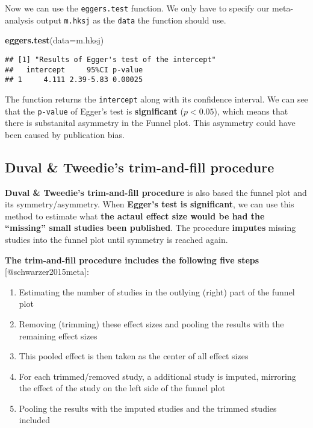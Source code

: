 \documentclass[]{book}
\newenvironment{Shaded}{\begin{snugshade}}{\end{snugshade}}
\newcommand{\KeywordTok}[1]{\textcolor[rgb]{0.13,0.29,0.53}{\textbf{#1}}}
\newcommand{\DataTypeTok}[1]{\textcolor[rgb]{0.13,0.29,0.53}{#1}}
\newcommand{\NormalTok}[1]{#1}
\providecommand{\tightlist}{%
  \setlength{\itemsep}{0pt}\setlength{\parskip}{0pt}}
\theoremstyle{definition}
\theoremstyle{definition}
\theoremstyle{definition}
\theoremstyle{remark}
\begin{document}
Now we can use the \texttt{eggers.test} function. We only have to
specify our meta-analysis output \texttt{m.hksj} as the \texttt{data}
the function should use.

\begin{Shaded}
\begin{Highlighting}[]
\KeywordTok{eggers.test}\NormalTok{(}\DataTypeTok{data=}\NormalTok{m.hksj)}
\end{Highlighting}
\end{Shaded}

\begin{verbatim}
## [1] "Results of Egger's test of the intercept"
##   intercept     95%CI p-value
## 1     4.111 2.39-5.83 0.00025
\end{verbatim}

The function returns the \texttt{intercept} along with its confidence
interval. We can see that the \texttt{p-value} of Egger's test is
\textbf{significant} (\(p<0.05\)), which means that there is substanital
asymmetry in the Funnel plot. This asymmetry could have been caused by
publication bias.

\hypertarget{dant}{\subsection{Duval \& Tweedie's trim-and-fill
procedure}\label{dant}}

\textbf{Duval \& Tweedie's trim-and-fill procedure}
\citep{duval2000trim} is also based the funnel plot and its
symmetry/asymmetry. When \textbf{Egger's test is significant}, we can
use this method to estimate what \textbf{the actaul effect size would be
had the ``missing'' small studies been published}. The procedure
\textbf{imputes} missing studies into the funnel plot until symmetry is
reached again.

\begin{rmdinfo}
\textbf{The trim-and-fill procedure includes the following five steps}
{[}@schwarzer2015meta{]}:

\begin{enumerate}
\def\labelenumi{\arabic{enumi}.}
\tightlist
\item
  Estimating the number of studies in the outlying (right) part of the
  funnel plot
\item
  Removing (trimming) these effect sizes and pooling the results with
  the remaining effect sizes
\item
  This pooled effect is then taken as the center of all effect sizes
\item
  For each trimmed/removed study, a additional study is imputed,
  mirroring the effect of the study on the left side of the funnel plot
\item
  Pooling the results with the imputed studies and the trimmed studies
  included
\end{enumerate}
\end{rmdinfo}
\end{document}
